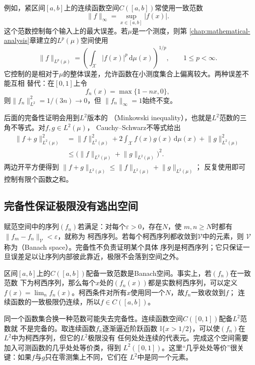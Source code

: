 例如，紧区间$[a,b]$上的连续函数空间$C([a,b])$常使用一致范数
\[
  \lVert f\rVert_{\infty}
  =\sup_{x\in[a,b]}|f(x)|.
\]
这个范数控制每个输入上的最大误差。若$\mu$是一个测度，则第
\ref{chap:mathematical-analysis}章建立的$L^p(\mu)$空间使用
\[
  \lVert f\rVert_{L^p(\mu)}
  =
  \left(\int_{\mathcal{X}}|f(x)|^p\,\mathrm{d}\mu(x)\right)^{1/p},
  \qquad 1\leq p<\infty.
\]
它控制的是相对于$\mu$的整体误差，允许函数在小测度集合上偏离较大。两种误差不能互相
替代：在$[0,1]$上令
\[
  f_n(x)=\max\{1-nx,0\},
\]
则$\lVert f_n\rVert_{L^2}^2=1/(3n)\to0$，但
$\lVert f_n\rVert_{\infty}=1$始终不变。

后面的完备性证明会用到$L^2$版本的
（Minkowski inequality），也就是$L^2$范数的三角不等式。对$f,g\in L^2(\mu)$，
Cauchy--Schwarz不等式给出
\[
  \begin{aligned}
  \lVert f+g\rVert_{L^2(\mu)}^2
  &=
  \lVert f\rVert_{L^2(\mu)}^2
  +
  2\int_{\mathcal{X}}f(x)g(x)\,\mathrm{d}\mu(x)
  +\lVert g\rVert_{L^2(\mu)}^2\\
  &\leq
  \bigl(
    \lVert f\rVert_{L^2(\mu)}
    +
    \lVert g\rVert_{L^2(\mu)}
  \bigr)^2.
  \end{aligned}
\]
两边开平方便得到
$\lVert f+g\rVert_{L^2(\mu)}
\leq\lVert f\rVert_{L^2(\mu)}+\lVert g\rVert_{L^2(\mu)}$；
反复使用即可控制有限个函数之和。

\subsection{完备性保证极限没有逃出空间}

赋范空间中的序列$(f_n)$若满足：对每个$\varepsilon>0$，存在$N$，使
$m,n\geq N$时都有$\lVert f_m-f_n\rVert_{\mathcal{V}}<\varepsilon$，就称为
柯西序列。若每个柯西序列都收敛到$\mathcal{V}$中的元素，则
$\mathcal{V}$称为（Banach space）。完备性不负责证明某个具体
序列是柯西序列；它只保证一旦误差足以让序列内部彼此靠近，极限不会落到空间之外。

区间$[a,b]$上的$C([a,b])$配备一致范数是Banach空间。事实上，若$(f_n)$在一致范数
下为柯西序列，那么每个$x$处的$(f_n(x))$都是实数柯西序列，可以定义
$f(x)=\lim_n f_n(x)$。柯西条件对所有$x$使用同一个$N$，故$f_n$一致收敛到$f$；
连续函数的一致极限仍连续，所以$f\in C([a,b])$。

同一个函数集合换一种范数可能失去完备性。连续函数空间$C([0,1])$配备$L^2$范数就
不是完备的。取连续函数$f_n$逐渐逼近阶跃函数
$\mathbb{I}\{x>1/2\}$，可以使$(f_n)$在$L^2$中为柯西序列，但它的$L^2$极限没有
任何处处连续的代表元。完成这个空间需要加入可测函数的几乎处处等价类，得到
$L^2([0,1])$。这里“几乎处处等价”很关键：如果$f$与$g$只在零测集上不同，它们在
$L^2$中是同一个元素。

